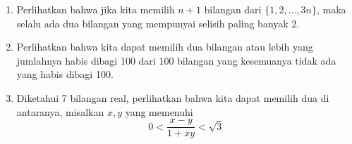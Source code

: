 \documentclass[11pt]{scrartcl}
\begin{document}
\begin{enumerate}
    \item Perlihatkan bahwa jika kita memilih $n + 1$ bilangan dari $\{1, 2, \ldots, 3n\}$, maka selalu ada dua bilangan yang mempunyai selisih paling banyak 2.
    

    \item Perlihatkan bahwa kita dapat memilih dua bilangan atau lebih yang jumlahnya habis dibagi 100 dari 100 bilangan yang kesemuanya tidak ada yang habis dibagi 100.
    \item Diketahui 7 bilangan real, perlihatkan bahwa kita dapat memilih dua di antaranya, misalkan $x, y$ yang memenuhi
    \[ 0 < \frac{x - y}{1 + xy} < \sqrt{3} \]

\end{enumerate}
\end{document}
